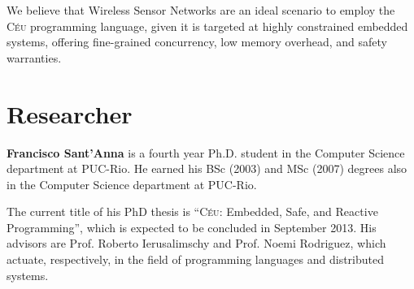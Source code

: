 \documentclass[pdftex,12pt,a4paper]{article}
\newcommand{\CEU}{\textsc{C\'{e}u}}
\begin{document}
We believe that Wireless Sensor Networks are an ideal scenario to employ the 
\CEU{} programming language, given it is targeted at highly constrained 
embedded systems, offering fine-grained concurrency, low memory overhead, and 
safety warranties.

\section{Researcher}

\textbf{Francisco Sant'Anna} is a fourth year Ph.D. student in the Computer 
Science department at PUC-Rio. He earned his BSc (2003) and MSc (2007) degrees 
also in the Computer Science department at PUC-Rio.

The current title of his PhD thesis is ``\CEU{}: Embedded, Safe, and Reactive 
Programming'', which is expected to be concluded in September 2013.
His advisors are Prof. Roberto Ierusalimschy and Prof. Noemi Rodriguez, which 
actuate, respectively, in the field of programming languages and distributed 
systems.
\end{document}
